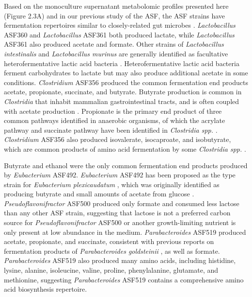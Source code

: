 \documentclass[11pt,twocolumn,notitlepage,openany,twoside]{book}
\begin{document}
\begin{refsection}
Based on the monoculture supernatant metabolomic profiles presented here (Figure 2.3A) and in our previous study of the ASF, the ASF strains have fermentation repertoires similar to closely-related gut microbes \cite{Biggs2017-fs}. \textit{Lactobacillus} ASF360 and \textit{Lactobacillus} ASF361 both produced lactate, while \textit{Lactobacillus} ASF361 also produced acetate and formate. Other strains of \textit{Lactobacillus intestinalis} and \textit{Lactobacillus murinus} are generally identified as facultative heterofermentative lactic acid bacteria \cite{Vos2011-bf}. Heterofermentative lactic acid bacteria ferment carbohydrates to lactate but may also produce additional acetate in some conditions. \textit{Clostridium} ASF356 produced the common fermentation end products acetate, propionate, succinate, and butyrate. Butyrate production is common in \textit{Clostridia} that inhabit mammalian gastrointestinal tracts, and is often coupled with acetate production \cite{Louis2009-ax}. Propionate is the primary end product of three common pathways identified in anaerobic organisms, of which the acrylate pathway and succinate pathway have been identified in \textit{Clostridia spp.} \cite{Reichardt2014-ua}. \textit{Clostridium} ASF356 also produced isovalerate, isocaproate, and isobutyrate, which are common products of amino acid fermentation by some \textit{Clostridia spp.} \cite{Mead1971-oa}.

Butyrate and ethanol were the only common fermentation end products produced by \textit{Eubacterium} ASF492. \textit{Eubacterium} ASF492 has been proposed as the type strain for \textit{Eubacterium plexicaudatum} \cite{Dewhirst1999-pp}, which was originally identified as producing butyrate and small amounts of acetate from glucose \cite{Wilkins1974-yn}. \textit{Pseudoflavonifractor} ASF500 produced only formate and consumed less lactose than any other ASF strain, suggesting that lactose is not a preferred carbon source for \textit{Pseudoflavonifractor} ASF500 or another growth-limiting nutrient is only present at low abundance in the medium. \textit{Parabacteroides} ASF519 produced acetate, propionate, and succinate, consistent with previous reports on fermentation products of \textit{Parabacteroides goldsteinii} \cite{Song2005-mt}, as well as formate. \textit{Parabacteroides} ASF519 also produced many amino acids, including histidine, lysine, alanine, isoleucine, valine, proline, phenylalanine, glutamate, and methionine, suggesting \textit{Parabacteroides} ASF519 contains a comprehensive amino acid biosynthesis repertoire.


\end{refsection}
\end{document}
